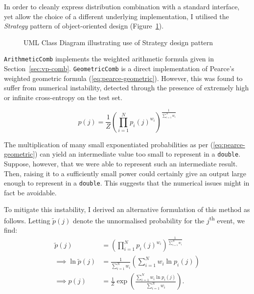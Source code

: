 \documentclass[12pt,a4paper,twoside,openright]{report}
\newcommand{\sref}[1]{Section~\ref{#1}}
\begin{document}
In order to cleanly express distribution combination with a standard interface,
yet allow the choice of a different underlying implementation, I utilised the
\emph{Strategy} pattern of object-oriented design
(Figure~\ref{fig:dist-strategy-uml}).

\begin{figure}[H]
\centering
\caption{UML Class Diagram illustrating use of Strategy design pattern}
\label{fig:dist-strategy-uml}
\end{figure}

\texttt{ArithmeticComb} implements the weighted arithmetic formula given in
\sref{sec:vp-comb}. \texttt{GeometricComb} is a direct implementation of
Pearce's weighted geometric formula (\ref{eq:pearce-geometric}). However, this
was found to suffer from numerical instability, detected through the presence of
extremely high or infinite cross-entropy on the test set. 

\begin{equation}
p(j) = \frac{1}{Z} \left( \prod_{i = 1}^N p_i(j)^{w_i} \right)^{ \frac{1}{
\sum_{i = 1}^N w_i }} \label{eq:pearce-geometric}
\end{equation}

The multiplication of many small exponentiated probabilities as per
(\ref{eq:pearce-geometric}) can yield an intermediate value too small to
represent in a \texttt{double}. Suppose, however, that we were able to represent
such an intermediate result. Then, raising it to a sufficiently small power
could certainly give an output large enough to represent in a \texttt{double}.
This suggests that the numerical issues might in fact be avoidable.

To mitigate this instability, I derived an alternative formulation of this
method as follows. Letting $\widetilde{p}(j)$ denote the unnormalised
probability for the $j$\textsuperscript{th} event, we find:
\begin{align*}
  \widetilde{p}(j) &= \left( \prod_{i=1}^N p_i(j)^{w_i}
  \right)^{\frac{1}{\sum_{i=1}^N w_i}} \\[3mm]
  \implies \ln{\widetilde{p}(j)} &= \frac{1}{\sum_{i = 1}^N w_i} \left( \sum_{i
  = 1}^N w_i \ln{p_i(j)} \right) \\[3mm]
  \implies p(j) &= \frac{1}{Z} \exp \left( \frac{\sum_{i = 1}^N w_i \ln{ p_i(j)
  }}{ \sum_{i = 1}^N w_i } \right).
\end{align*}
\end{document}
